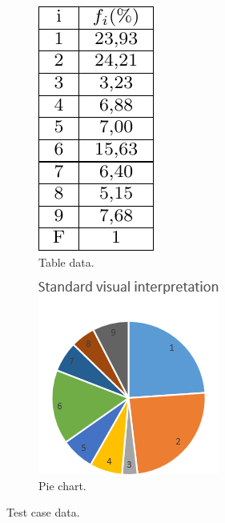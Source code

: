 \documentclass[11pt,leqno]{book}
\begin{document}
\begin{figure}
\centering
\begin{subfigure}{.5\textwidth}
  \centering
  \includegraphics[width=.4\linewidth]{pic07.png}
  \caption{Table data.}
  \label{fig:sub3}
\end{subfigure}%
\begin{subfigure}{.5\textwidth}
  \centering
  \includegraphics[width=.8\linewidth]{pic02.png}
  \caption{Pie chart.}
  \label{fig:sub4}
\end{subfigure}
\caption{Test case data.}
\label{fig:two}
\end{figure}
\end{document}

